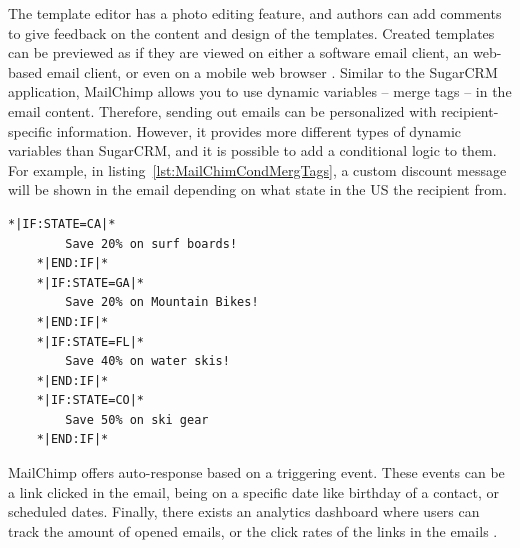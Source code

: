 The template editor has a photo editing feature, and authors can add comments to give feedback on the content and design of the templates. Created templates can be previewed as if they are viewed on either a software email client, an web-based email client, or even on a mobile web browser \citep{TheRocketScienceGroupLLC2013a}. Similar to the SugarCRM application, MailChimp allows you to use dynamic variables -- merge tags -- in the email content. Therefore, sending out emails can be personalized with recipient-specific information. However, it provides more different types of dynamic variables than SugarCRM, and it is possible to add a conditional logic to them. For example, in listing~\ref{lst:MailChimCondMergTags}, a custom discount message will be shown in the email depending on what state in the US the recipient from.
\vspace{1cm}


\begin{lstlisting}[language=XML, caption={[MailChimp's Conditional Merge Tags]MailChimp's Conditional Merge Tags \citep{TheRocketScienceGroupLLC2013b}}, label={lst:MailChimCondMergTags}]
	*|IF:STATE=CA|*
		Save 20% on surf boards!
	*|END:IF|* 
	*|IF:STATE=GA|*
		Save 20% on Mountain Bikes!
	*|END:IF|* 
	*|IF:STATE=FL|*
		Save 40% on water skis!
	*|END:IF|* 
	*|IF:STATE=CO|*
		Save 50% on ski gear
	*|END:IF|*
\end{lstlisting}

MailChimp offers auto-response based on a triggering event. These events can be a link clicked in the email, being on a specific date like birthday of a contact, or scheduled dates. Finally, there exists an analytics dashboard where users can track the amount of opened emails, or the click rates of the links in the emails \citep{TheRocketScienceGroupLLC2013c,TheRocketScienceGroupLLC2013d,TheRocketScienceGroupLLC2013e}.

